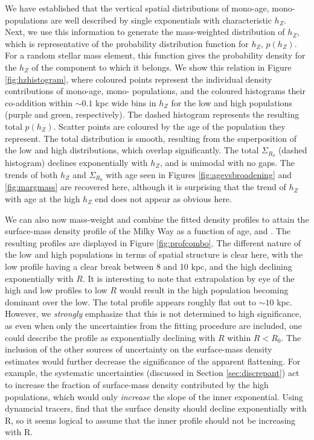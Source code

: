 We have established that the vertical spatial distributions of mono-age, mono-\feh{} populations are well described by single exponentials with characteristic $h_Z$. Next, we use this information to generate the mass-weighted distribution of $h_Z$, which is representative of the probability distribution function for $h_Z$, $p(h_Z)$. For a random stellar mass element, this function gives the probability density for the $h_Z$ of the component to which it belongs. We show this relation in Figure \ref{fig:hzhistogram}, where coloured points represent the individual density contributions of mono-age, mono-\feh{} populations, and the coloured histograms their co-addition within $\sim 0.1$ kpc wide bins in $h_Z$ for the low and high \afe{} populations (purple and green, respectively). The dashed histogram represents the resulting total $p(h_Z)$. Scatter points are coloured by the age of the population they represent. The total distribution is smooth, resulting from the superposition of the low and high \afe{} distributions, which overlap significantly.  The total $\Sigma_{R_0}$ (dashed histogram) declines exponentially with $h_Z$, and is unimodal with no gaps. The trends of both $h_Z$ and $\Sigma_{R_0}$ with age seen in Figures \ref{fig:agevsbroadening} and \ref{fig:margmass} are recovered here, although it is surprising that the trend of $h_Z$ with age at the high $h_Z$ end does not appear as obvious here.

We can also now mass-weight and combine the fitted density profiles to attain the surface-mass density profile of the Milky Way as a function of age, \feh{} and \afe{}. The resulting profiles are displayed in Figure \ref{fig:profcombo}. The different nature of the low and high \afe{} populations in terms of spatial structure is clear here, with the low \afe{} profile having a clear break between 8 and 10 kpc, and the high \afe{} declining exponentially with $R$. It is interesting to note that extrapolation by eye of the high and low \afe{} profiles to low $R$ would result in the high \afe{} population becoming dominant over the low. The total profile appears roughly flat out to $\sim 10$ kpc. However, we \emph{strongly} emphasize that this is not determined to high significance, as even when only the uncertainties from the fitting procedure are included, one could describe the profile as exponentially declining with $R$ within $R < R_0$. The inclusion of the other sources of uncertainty on the surface-mass density estimates would further decrease the significance of the apparent flattening. For example, the systematic uncertainties (discussed in Section \ref{sec:discrepant}) act to increase the fraction of surface-mass density contributed by the high \afe{} populations, which would only \emph{increase} the slope of the inner exponential. Using dynamcial tracers, \citet{2013ApJ...779..115B} find that the surface density should decline exponentially with R, so it seems logical to assume that the inner profile should not be increasing with R.

